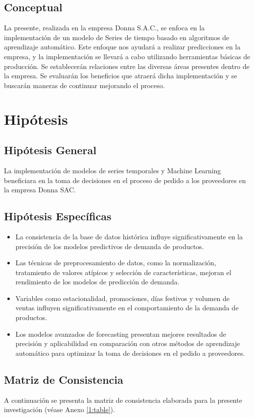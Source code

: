 \subsection{Conceptual}
La presente, realizada en la empresa Donna S.A.C., se enfoca en la implementación de un modelo de Series de tiempo basado en algoritmos de aprendizaje automático. Este enfoque nos ayudará a realizar predicciones en la empresa, y la implementación se llevará a cabo utilizando herramientas básicas de producción. Se establecerán relaciones entre las diversas áreas presentes dentro de la empresa. Se evaluarán los beneficios que atraerá dicha implementación y se buscarán maneras de continuar mejorando el proceso.

\section{Hipótesis}

\subsection{Hipótesis General}
\newcommand{\HipotesisGeneral}{
La implementación de modelos de series temporales y Machine Learning beneficiara en la toma de decisiones en el proceso de pedido a los proveedores en la empresa Donna SAC.
}
\HipotesisGeneral
\subsection{Hipótesis Específicas}
\newcommand{\Hone}{
La consistencia de la base de datos histórica influye significativamente en la precisión de los modelos predictivos de demanda de productos.
}
\newcommand{\Htwo}{
Las técnicas de preprocesamiento de datos, como la normalización, tratamiento de valores atípicos y selección de características, mejoran el rendimiento de los modelos de predicción de demanda.
}
\newcommand{\Hthree}{
Variables como estacionalidad, promociones, días festivos y volumen de ventas influyen significativamente en el comportamiento de la demanda de productos.
}
\newcommand{\Hfour}{
Los modelos avanzados de forecasting presentan mejores resultados de precisión y aplicabilidad en comparación con otros métodos de aprendizaje automático para optimizar la toma de decisiones en el pedido a proveedores.
}


\begin{itemize}
	\item \Hone
	\item \Htwo
	\item \Hthree
	\item \Hfour
\end{itemize}

\subsection{Matriz de Consistencia}
A continuación se presenta la matriz de consistencia elaborada para la presente investigación (véase Anexo \ref{1:table}).

